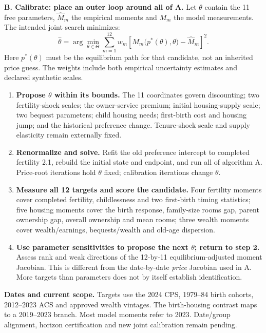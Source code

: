 \documentclass[10pt]{article}
\newcommand{\lead}[1]{\textbf{\color{ink}#1}}
\begin{document}
\lead{B. Calibrate: place an outer loop around all of A.}
Let $\theta$ contain the 11 free parameters, $\widehat M_m$ the empirical moments and $M_m$ the model measurements. The intended joint search minimizes:
\[
 \widehat\theta=\arg\min_{\theta\in\Theta}\sum_{m=1}^{12}
 w_m\left[M_m\bigl(p^*(\theta),\theta\bigr)-\widehat M_m\right]^2.
\]
Here $p^*(\theta)$ must be the equilibrium path for that candidate, not an inherited price guess. The weights include both empirical uncertainty estimates and declared synthetic scales.

\begin{enumerate}[itemsep=3pt]
\item \textbf{Propose $\theta$ within its bounds.} The 11 coordinates govern discounting; two fertility-shock scales; the owner-service premium; initial housing-supply scale; two bequest parameters; child housing needs; first-birth cost and housing jump; and the historical preference change. Tenure-shock scale and supply elasticity remain externally fixed.
\item \textbf{Renormalize and solve.} Refit the old preference intercept to completed fertility 2.1, rebuild the initial state and endpoint, and run all of algorithm A. Price-root iterations hold $\theta$ fixed; calibration iterations change $\theta$.
\item \textbf{Measure all 12 targets and score the candidate.} Four fertility moments cover completed fertility, childlessness and two first-birth timing statistics; five housing moments cover the birth response, family-size rooms gap, parent ownership gap, overall ownership and mean rooms; three wealth moments cover wealth/earnings, bequests/wealth and old-age dispersion.
\item \textbf{Use parameter sensitivities to propose the next $\theta$; return to step 2.} Assess rank and weak directions of the 12-by-11 equilibrium-adjusted moment Jacobian. This is different from the date-by-date \emph{price} Jacobian used in A. More targets than parameters does not by itself establish identification.
\end{enumerate}

\lead{Dates and current scope.} Targets use the 2024 CPS, 1979--84 birth cohorts, 2012--2023 ACS and approved wealth vintages. The birth-housing contrast maps to a 2019--2023 branch. Most model moments refer to 2023. Date/group alignment, horizon certification and new joint calibration remain pending.
\end{document}
